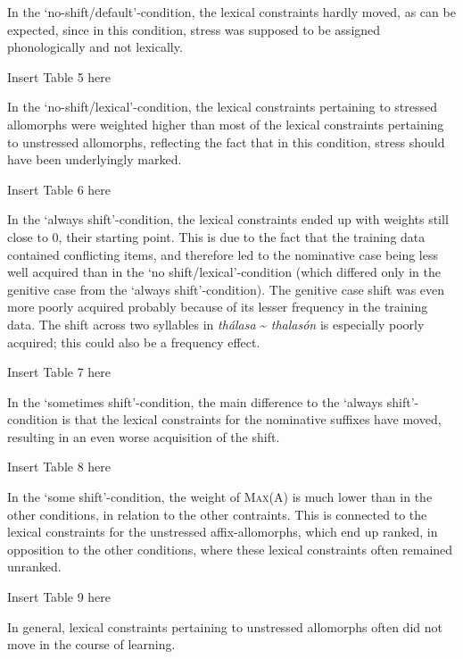 \documentclass[a4paper]{article}
\begin{document}
In the ‘no-shift/default’-condition, the lexical constraints hardly moved, as can be expected, since in this condition, stress was supposed to be assigned phonologically and not lexically.

{\centering
Insert Table 5 here
\par}

In the ‘no-shift/lexical’-condition, the lexical constraints pertaining to stressed allomorphs were weighted higher than most of the lexical constraints pertaining to unstressed allomorphs, reflecting the fact that in this condition, stress should have been underlyingly marked.

{\centering
Insert Table 6 here
\par}

In the ‘always shift’-condition, the lexical constraints ended up with weights still close to 0, their starting point. This is due to the fact that the training data contained conflicting items, and therefore led to the nominative case being less well acquired than in the ‘no shift/lexical’-condition (which differed only in the genitive case from the ‘always shift’-condition). The genitive case shift was even more poorly acquired probably because of its lesser frequency in the training data. The shift across two syllables in \textit{thálasa} \~{} \textit{thalasón} is especially poorly acquired; this could also be a frequency effect.

{\centering
Insert Table 7 here
\par}

In the ‘sometimes shift’-condition, the main difference to the ‘always shift’-condition is that the lexical constraints for the nominative suffixes have moved, resulting in an even worse acquisition of the shift.

{\centering
Insert Table 8 here
\par}

In the ‘some shift’-condition, the weight of \textsc{Max}(A) is much lower than in the other conditions, in relation to the other contraints. This is connected to the lexical constraints for the unstressed affix-allomorphs, which end up ranked, in opposition to the other conditions, where these lexical constraints often remained unranked.

{\centering
Insert Table 9 here
\par}

In general, lexical constraints pertaining to unstressed allomorphs often did not move in the course of learning.
\end{document}
